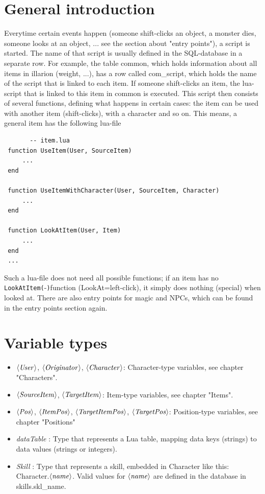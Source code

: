 \documentclass[a4paper,10pt,makeidx]{scrreprt}
\newcommand{\com}[2]{\index{#1}\texttt{#1(}#2\texttt{)}}
\newcommand{\var}[1]{$\left\langle \text{\emph{#1}} \right\rangle$}
\newcommand{\datatable}{\textsl{dataTable }}
\newcommand{\Skill}{\textsl{Skill }}
\begin{document}
\section{General introduction}
Everytime certain events happen (someone shift-clicks an object, a monster dies, someone looks at an
object, ... see the section about "entry points"), a script is started. The name of that script
is usually defined in the SQL-database in a separate row. For example, the table common, which
holds information about all items in illarion (weight, ...), has a row called com\_script,
which holds the name of the script that is linked to each item.
If someone shift-clicks an item, the lua-script that is linked to this item in common is
executed. This script then consists of several functions, defining what happens in certain cases: the item
can be used with another item (shift-clicks), with a character and so on. This means, a general item has the following
lua-file

\begin{verbatim}
       -- item.lua
 function UseItem(User, SourceItem)
     ...
 end

 function UseItemWithCharacter(User, SourceItem, Character)
     ...
 end

 function LookAtItem(User, Item)
     ...
 end
 ...
\end{verbatim}

Such a lua-file does not need all possible functions; if an item has no \com{LookAtItem}-function (LookAt=left-click),
it simply does nothing (special) when looked at. There are also entry points for magic and NPCs, which can
be found in the entry points section again.

\section{Variable types}
\begin{itemize}
        \item       \var{User}, \var{Originator}, \var{Character}: Character-type variables, see chapter "Characters".
        \item       \var{SourceItem}, \var{TargetItem}: Item-type variables, see chapter "Items".
        \item       \var{Pos}, \var{ItemPos}, \var{TargetItemPos}, \var{TargetPos}: Position-type variables, see chapter "Positions"
        \item       \datatable: Type that represents a Lua table, mapping data keys (strings) to data values (strings or integers).
        \item       \Skill: Type that represents a skill, embedded in Character like this: Character.\var{name}. Valid values for \var{name} are defined in the database in skills.skl\_name.
\end{itemize}
\end{document}
